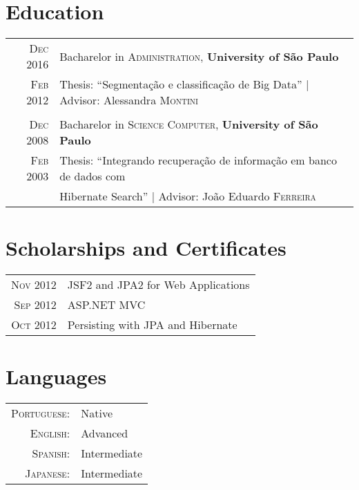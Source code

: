 \documentclass[a4paper,10pt]{article}
\begin{document}
\section{Education}
\begin{tabular}{rl} 
 \textsc{Dec} 2016 & Bacharelor in \textsc{Administration}, \textbf{University of São Paulo}\\
\textsc{Feb} 2012&Thesis: ``Segmentação e classificação de Big Data'' | \small Advisor: Alessandra \textsc{Montini}\\\\
\textsc{Dec} 2008& Bacharelor in \textsc{Science Computer}, \textbf{University of São Paulo}\\
\textsc{Feb} 2003& Thesis: ``Integrando recuperação de informação em banco de dados com \\
& Hibernate Search'' | \small Advisor: João Eduardo \textsc{Ferreira}\\
\end{tabular}

\section{Scholarships and Certificates}
\begin{tabular}{rl}
 \textsc{Nov} 2012 & JSF2 and JPA2 for Web Applications\\
\textsc{Sep} 2012 & ASP.NET MVC\\
\textsc{Oct} 2012 & Persisting with JPA and Hibernate\\
\end{tabular}

\section{Languages}
\begin{tabular}{rl}
 \textsc{Portuguese:}&Native\\
\textsc{English:}&Advanced\\
\textsc{Spanish:}&Intermediate\\
\textsc{Japanese:}&Intermediate\\
\end{tabular}


\end{document}
